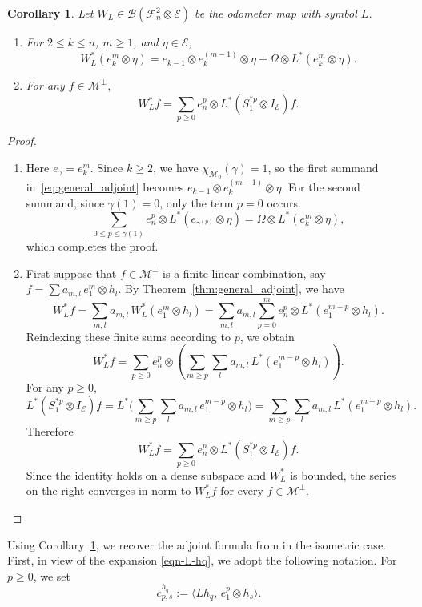 \documentclass[12pt]{amsart}
\newtheorem{corollary}[theorem]{Corollary}
\theoremstyle{definition}
\theoremstyle{remark}
\newcommand{\clb}{\mathcal{B}}
\newcommand{\cle}{\mathcal{E}}
\newcommand{\clm}{\mathcal{M}}
\newcommand{\clf}{\mathcal{F}}
\numberwithin{equation}{section}
\begin{document}
\begin{corollary}\label{cor:WL_adjoint}
Let $W_L \in \clb(\clf_n^2 \otimes \cle)$ be the odometer map with symbol $L$. 
\begin{enumerate}
    \item For $2 \le k \le n$, $m \ge 1$, and $\eta \in \cle$,
    \begin{equation} \label{eq:adjoint_k}
W_L^*(e_k^{ m} \otimes \eta) = e_{k-1} \otimes e_k^{ (m-1)} \otimes \eta + \Omega \otimes L^*(e_k^{m} \otimes \eta).
\end{equation}
\item For any $f  \in \clm^{\perp},$
\[
W_L^* f = \sum_{p \ge 0} e_n^p \otimes L^* (S_1^{*p} \otimes I_\cle) f.
\]
\end{enumerate}
\end{corollary}
\begin{proof}
    \begin{enumerate}
        \item Here $e_{\gamma}=e_k^{ m}$. Since $k \ge 2$, we have $\chi_{\clm_0}(\gamma) = 1$, so the first summand in~\eqref{eq:general_adjoint} becomes 
$e_{k-1} \otimes e_k^{(m-1)} \otimes \eta$. 
For the second summand, since \(\gamma(1)=0\), only the term \(p=0\) occurs.
\[
\sum_{0 \leq p \leq \gamma(1)}  e_{n}^p \otimes L^*(e_{\gamma^{(p)}}\otimes \eta)=\Omega \otimes L^*(e_k^{ m} \otimes \eta),
\]
which completes the proof.

\item 
First suppose that \(f\in\clm^\perp\) is a finite linear combination, say $f=\sum
a_{m,l}\,e_1^m\otimes h_l.$ By Theorem~\ref{thm:general_adjoint}, we have
\[
W_L^*f
=
\sum_{m,l} a_{m,l}\,W_L^*(e_1^m\otimes h_l)
=
\sum_{m,l} a_{m,l}
\sum_{p=0}^{m}
e_n^p\otimes L^*(e_1^{m-p}\otimes h_l).
\]
Reindexing these finite sums according to \(p\), we obtain
\[
W_L^*f
=
\sum_{p\geq 0}
e_n^p\otimes
\left(
\sum_{m\geq p}\sum_l
a_{m,l}\,L^*(e_1^{m-p}\otimes h_l)
\right).
\]
For any $p \ge 0$,
\[
L^*(S_1^{*p} \otimes I_\cle) f = L^*\big(\sum_{m \ge p} \sum_l a_{m,l} \, e_1^{m-p} \otimes h_l\big)
= \sum_{m \ge p} \sum_l a_{m,l} \, L^*(e_1^{m-p} \otimes h_l).
\]
Therefore
\[
W_L^* f = \sum_{p \ge 0} e_n^p \otimes L^* (S_1^{*p} \otimes I_\cle) f.
\]
Since the identity holds on a dense subspace and \(W_L^*\) is bounded, the
series on the right converges in norm to \(W_L^*f\) for every
\(f\in\clm^\perp\).
    \end{enumerate}
\end{proof}

Using Corollary~\ref{cor:WL_adjoint}, we recover the adjoint formula from
\cite[Proposition~4.1]{mansi2025} in the isometric case.
First, in view of the expansion \eqref{eqn-L-hq}, we adopt the following notation. For $p \ge 0$, we set
\[
c^{h_q}_{p,s} := \langle Lh_q,\, e_1^{ p} \otimes h_s \rangle.
\]
\end{document}
